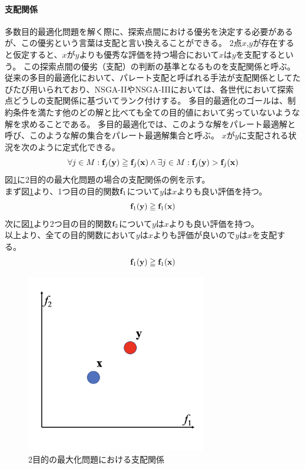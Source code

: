 \documentclass[10pt, a4paper, titlepage]{jarticle}
\begin{document}
\paragraph{支配関係}
多数目的最適化問題を解く際に、探索点間における優劣を決定する必要があるが、この優劣という言葉は支配と言い換えることができる。
2点$x$,$y$が存在すると仮定すると、$x$が$y$よりも優秀な評価を持つ場合において$x$は$y$を支配するという。
この探索点間の優劣（支配）の判断の基準となるものを支配関係と呼ぶ。
従来の多目的最適化において、パレート支配と呼ばれる手法が支配関係としてたびたび用いられており、NSGA-IIやNSGA-IIIにおいては、各世代において探索点どうしの支配関係に基づいてランク付けする。
多目的最適化のゴールは、制約条件を満たす他のどの解と比べても全ての目的値において劣っていないような解を求めることである。
多目的最適化では、このような解をパレート最適解と呼び、このような解の集合をパレート最適解集合と呼ぶ。
$x$が$y$に支配される状況を次のように定式化できる。
\begin{equation}
\forall j \in {M}:{\bf f}_j({\bf y}) \geqq {\bf f}_j({\bf x}) \land \exists j \in M:{\bf f}_j({\bf y}) > {\bf f}_j({\bf x})
\end{equation}
図\ref{pareto-dominance}に2目的の最大化問題の場合の支配関係の例を示す。\\
まず図\ref{pareto-dominance}より、1つ目の目的関数${\bf f}_1$について$y$は$x$よりも良い評価を持つ。\\
\begin{equation}
{\bf f}_1({\bf y}) \geqq {\bf f}_1({\bf x})
\end{equation}
次に図\ref{pareto-dominance}より2つ目の目的関数${\bf f}_2$について$y$は$x$よりも良い評価を持つ。\\
以上より、全ての目的関数において$y$は$x$よりも評価が良いので$y$は$x$を支配する。
\begin{equation}
{\bf f}_1({\bf y}) \geqq {\bf f}_1({\bf x})
\end{equation}


\begin{figure}[h]
\begin{center}
\includegraphics[width=0.7\textwidth]{paretodominace.png}
\end{center}
\label{pareto-dominance}
\caption{2目的の最大化問題における支配関係}
\end{figure}
\end{document}
